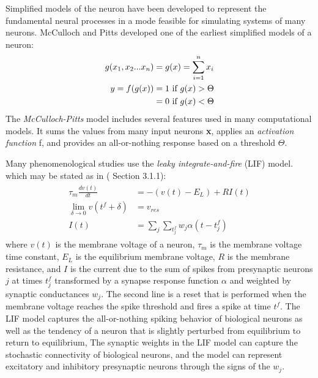 Simplified models of the neuron have been developed to represent the fundamental neural processes in a mode feasible for simulating systems of many neurons.
McCulloch and Pitts\citep{McCulloch1943} developed one of the earliest simplified models of a neuron:
\begin{align}
  \begin{split}
    g(x_1,x_2...x_n) &= g(\boldmath{x})=\sum_{i=1}^n x_i \\
    y = f(g(x)) &= 1 \text{ if } g(x)>\Theta \\
		&= 0 \text{ if } g(x)<\Theta \\
  \end{split}
\end{align}
The \textit{McCulloch-Pitts} model includes several features used in many computational models.
It sums the values from many input neurons \textbf{x}, applies an \textit{activation function} f, and provides an all-or-nothing response based on a threshold $\Theta$.

Many phenomenological studies use the \textit{leaky integrate-and-fire} (LIF) model\citep{Abbott1999}. which may be stated as in (\citet{Trappenberg2010} Section 3.1.1):
\begin{align}
  \begin{split}
    \tau_m \frac{dv(t)}{dt} &= -(v(t)-E_L) + RI(t) \\
    \displaystyle\lim_{\delta \rightarrow 0} v(t^f + \delta) &= v_{res}\\ 
    I(t) &= \sum_j \sum_{t^f_j}w_j\alpha(t-t^f_j)
  \end{split}
\end{align}
where $v(t)$ is the membrane voltage of a neuron, $\tau_m$ is the membrane voltage time constant, $E_L$ is the equilibrium membrane voltage, $R$ is the membrane resistance, and
$I$ is the current due to the sum of spikes from presynaptic neurons $j$ at times $t^f_j$ transformed by a synapse response function $\alpha$ and weighted by synaptic conductances $w_j$.
The second line is a reset that is performed when the membrane voltage reaches the spike threshold and fires a spike at time $t^f$.
The LIF model captures the all-or-nothing spiking behavior of biological neurons as well as the tendency of a neuron that is slightly perturbed from equilibrium to return to equilibrium,
The synaptic weights in the LIF model can capture the stochastic connectivity of biological neurons, and the model can represent excitatory and inhibitory presynaptic neurons through the signs of the $w_j$.

